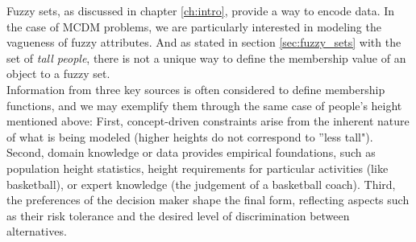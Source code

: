Fuzzy sets, as discussed in chapter \ref{ch:intro}, provide a way to encode data. In the case of MCDM  problems, we are particularly interested in modeling the vagueness of fuzzy attributes. And as stated in section \ref{sec:fuzzy_sets} with the set of \emph{tall people}, there is not a unique way to define the membership value of an object to a fuzzy set.\\

Information from three key sources is often considered to define membership functions, and we may exemplify them through the same case of people's height mentioned above: First, concept-driven constraints arise from the inherent nature of what is being modeled (higher heights do not correspond to ''less tall"). Second, domain knowledge or data provides empirical foundations, such as population height statistics, height requirements for particular activities (like basketball), or expert knowledge (the judgement of a basketball coach). Third, the preferences of the decision maker shape the final form, reflecting aspects such as their risk tolerance and the desired level of discrimination between alternatives.\\









